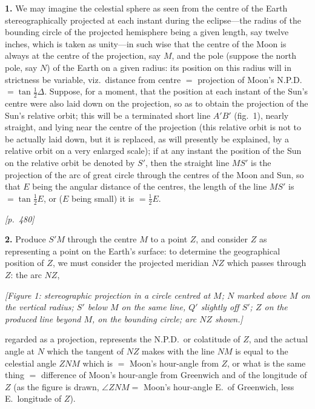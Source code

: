 \documentclass[11pt]{article}
\begin{document}
\medskip

\textbf{1.} We may imagine the celestial sphere as seen from the centre of
the Earth stereographically projected at each instant during the
eclipse---the radius of the bounding circle of the projected hemisphere
being a given length, say twelve inches, which is taken as unity---in such
wise that the centre of the Moon is always at the centre of the projection,
say $M$, and the pole (suppose the north pole, say $N$) of the Earth on a
given radius: its position on this radius will in strictness be variable,
viz.\ distance from centre $=$ projection of Moon's N.P.D. $=\tan\tfrac{1}{2}\Delta$.
Suppose, for a moment, that the position at each instant of the Sun's
centre were also laid down on the projection, so as to obtain the
projection of the Sun's relative orbit; this will be a terminated short
line $A'B'$ (fig.~1), nearly straight, and lying near the centre of the
projection (this relative orbit is not to be actually laid down, but it is
replaced, as will presently be explained, by a relative orbit on a very
enlarged scale); if at any instant the position of the Sun on the relative
orbit be denoted by $S'$, then the straight line $MS'$ is the projection of
the arc of great circle through the centres of the Moon and Sun, so that
$E$ being the angular distance of the centres, the length of the line
$MS'$ is $=\tan\tfrac{1}{2}E$, or ($E$ being small) it is $=\tfrac{1}{2}E$.

\medskip

\noindent\textit{[p.~480]}

\medskip

\textbf{2.} Produce $S'M$ through the centre $M$ to a point $Z$, and
consider $Z$ as representing a point on the Earth's surface: to determine
the geographical position of $Z$, we must consider the projected meridian
$NZ$ which passes through $Z$: the arc $NZ$,

\begin{center}
\textit{[Figure 1: stereographic projection in a circle centred at $M$;
$N$ marked above $M$ on the vertical radius; $S'$ below $M$ on the same
line, $Q'$ slightly off $S'$; $Z$ on the produced line beyond $M$, on the
bounding circle; arc $NZ$ shown.]}
\end{center}

\smallskip

regarded as a projection, represents the N.P.D.\ or colatitude of $Z$, and
the actual angle at $N$ which the tangent of $NZ$ makes with the line
$NM$ is equal to the celestial angle $ZNM$ which is $=$ Moon's hour-angle
from $Z$, or what is the same thing $=$ difference of Moon's hour-angle
from Greenwich and of the longitude of $Z$ (as the figure is drawn,
$\angle ZNM = $ Moon's hour-angle E.\ of Greenwich, less E.\ longitude of
$Z$).
\end{document}
